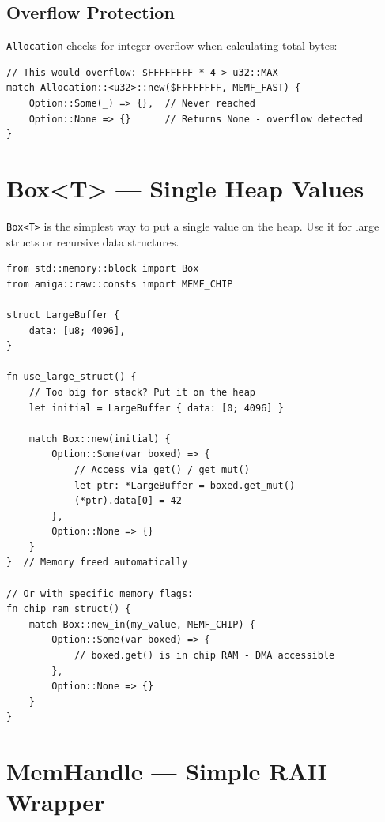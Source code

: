 \subsection{Overflow Protection}

\texttt{Allocation} checks for integer overflow when calculating total bytes:

\begin{lstlisting}
// This would overflow: $FFFFFFFF * 4 > u32::MAX
match Allocation::<u32>::new($FFFFFFFF, MEMF_FAST) {
    Option::Some(_) => {},  // Never reached
    Option::None => {}      // Returns None - overflow detected
}
\end{lstlisting}

\section{Box<T> --- Single Heap Values}
\label{sec:box}

\texttt{Box<T>} is the simplest way to put a single value on the heap. Use it for large structs or recursive data structures.

\begin{lstlisting}
from std::memory::block import Box
from amiga::raw::consts import MEMF_CHIP

struct LargeBuffer {
    data: [u8; 4096],
}

fn use_large_struct() {
    // Too big for stack? Put it on the heap
    let initial = LargeBuffer { data: [0; 4096] }

    match Box::new(initial) {
        Option::Some(var boxed) => {
            // Access via get() / get_mut()
            let ptr: *LargeBuffer = boxed.get_mut()
            (*ptr).data[0] = 42
        },
        Option::None => {}
    }
}  // Memory freed automatically

// Or with specific memory flags:
fn chip_ram_struct() {
    match Box::new_in(my_value, MEMF_CHIP) {
        Option::Some(var boxed) => {
            // boxed.get() is in chip RAM - DMA accessible
        },
        Option::None => {}
    }
}
\end{lstlisting}

\section{MemHandle --- Simple RAII Wrapper}
\label{sec:memhandle}

